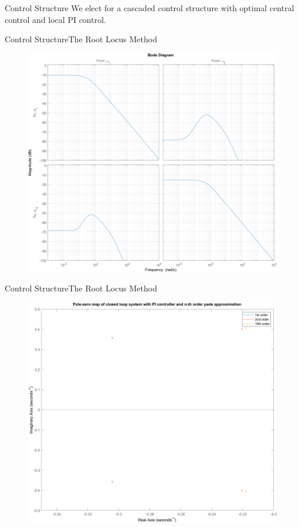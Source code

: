 
\begin{frame}{Control Structure}
	We elect for a cascaded control structure with optimal central control and local PI control.
	\begin{figure}[h!]
		\centering
		\resizebox{\columnwidth}{!}{
			}
		\label{fig:tikzControlStrat}
	\end{figure}
\end{frame}

\begin{frame}{Control Structure}{The Root Locus Method}
	\begin{figure}[h]
		\centering
		\includegraphics[width=0.75\linewidth]{Topics/ControlStructure/Graphics/PumpMagPlot.png}
		\label{fig:PumpMagPlot}
	\end{figure}
\end{frame}

\begin{frame}{Control Structure}{The Root Locus Method}

	\begin{figure}[h]
		\centering
		\includegraphics[width=0.75\linewidth]{Topics/ControlStructure/Graphics/PZmap_CL_zoom.png}
		\label{fig:PZmap_CL_zoom}
	\end{figure}
\end{frame}



